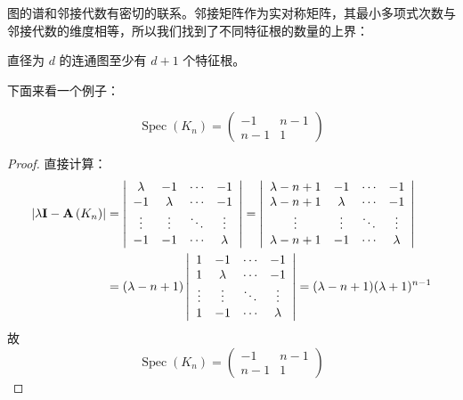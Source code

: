 图的谱和邻接代数有密切的联系。邻接矩阵作为实对称矩阵，其最小多项式次数与邻接代数的维度相等，所以我们找到了不同特征根的数量的上界：

\begin{corollary}
直径为 $d$ 的连通图至少有 $d + 1$ 个特征根。
\end{corollary}

下面来看一个例子：

\begin{proposition}[完全图的谱]
\[
\operatorname{Spec}\left(K_{n}\right)=\left(\begin{array}{cc}
-1 & n-1 \\
n-1 & 1
\end{array}\right)
\]
\end{proposition}

\begin{proof}
直接计算：
\[
\begin{aligned}
\left|\lambda \textbf I-\textbf{A} \left(K_{n}\right)\right|
&=
\left|\begin{array}{cccc}
\lambda & -1 & \cdots & -1 \\
-1 & \lambda & \cdots & -1 \\
\vdots & \vdots & \ddots & \vdots \\
-1 & -1 & \cdots & \lambda
\end{array}\right|
=
\left|\begin{array}{cccc}
\lambda - n + 1 & -1 & \cdots & -1 \\
\lambda - n + 1 & \lambda & \cdots & -1 \\
\vdots & \vdots & \ddots & \vdots \\
\lambda - n + 1 & -1 & \cdots & \lambda
\end{array}\right|\\
&=
(\lambda - n + 1)\left|\begin{array}{cccc}
1 & -1 & \cdots & -1 \\
1 & \lambda & \cdots & -1 \\
\vdots & \vdots & \ddots & \vdots \\
1 & -1 & \cdots & \lambda
\end{array}\right|
=(\lambda - n + 1)(\lambda + 1) ^ {n - 1}
\end{aligned}
\]
故
\[
\operatorname{Spec}\left(K_{n}\right)=\left(\begin{array}{cc}
-1 & n-1 \\
n-1 & 1
\end{array}\right)
\]
\end{proof}



